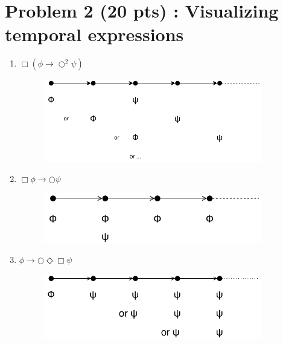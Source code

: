 \documentclass[12pt]{article}
\begin{document}
\newpage

\section*{Problem 2 (20 pts) :  Visualizing temporal expressions}

\begin{enumerate}

	\item $\Box (\phi \rightarrow \bigcirc^{2} \psi)$

  \begin{figure}[h!]
   \centering
   \includegraphics[width=0.9\textwidth]{figures/2_1.pdf}
  \end{figure}

	\item $\Box \phi \rightarrow \bigcirc \psi$

  \begin{figure}[h!]
   \centering
   \includegraphics[width=0.9\textwidth]{figures/2_2.pdf}
  \end{figure}

	\item $\phi \rightarrow \bigcirc \Diamond \Box \psi$

  \begin{figure}[h!]
    \centering
    \includegraphics[width=0.9\textwidth]{figures/2_3.pdf}
   \end{figure}


\end{enumerate}
\end{document}
